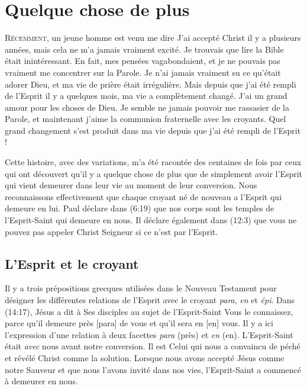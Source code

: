 \chapter{Quelque chose de plus}

\lettrine{R}{écemment}, un jeune homme est venu me dire\frcolon{}
 \Og J'ai accepté Christ il y a plusieurs années,
 mais cela ne m'a jamais vraiment excité.
 Je trouvais que lire la Bible était inintéressant.
 En fait, mes pensées vagabondaient, et je ne pouvais pas vraiment me concentrer
 sur la Parole. Je n'ai jamais vraiment su ce qu'était adorer Dieu,
 et ma vie de prière était irrégulière. Mais depuis que j'ai été rempli
 de l'Esprit il y a quelques mois, ma vie a complètement changé.
 J'ai un grand amour pour les choses de Dieu.
 Je semble ne jamais pouvoir me rassasier de la Parole, et maintenant j'aime
 la communion fraternelle avec les croyants.
 Quel grand changement s'est produit dans ma vie depuis que j'ai été rempli
 de l'Esprit ! \Fg{}

Cette histoire, avec des variations, m'a été racontée des centaines de fois
 par ceux qui ont découvert qu'il y a quelque chose de plus que de simplement
 avoir l'Esprit qui vient demeurer dans leur vie au moment de leur conversion.
 Nous reconnaissons effectivement que chaque croyant né de nouveau a l'Esprit
 qui demeure en lui. Paul déclare dans (6:19) que nos corps
 sont les temples de l'Esprit-Saint qui demeure en nous.
 Il déclare également dans (12:3) que vous ne pouvez pas
 appeler Christ Seigneur si ce n'est par l'Esprit.


\section{L'Esprit et le croyant}

Il y a trois prépositions grecques utilisées dans le Nouveau Testament
 pour désigner les différentes relations de l'Esprit avec le croyant\frcolon{}
 \emph{para}, \emph{en} et \emph{épi}.
 Dans (14:17), Jésus a dit à Ses disciples au sujet de
 l'Esprit-Saint\frcolon{} \Og Vous le connaissez, parce qu'il demeure près [para]
 de vous et qu'il sera en [en] vous. \Fg{}
 Il y a ici l'expression d'une relation à deux facettes\frcolon{}
 \emph{para} (près) et \emph{en} (en).
 L'Esprit-Saint était \emph{avec} nous avant notre conversion.
 Il est Celui qui nous a con\-vain\-cu de péché et révélé Christ
 comme la solution. Lorsque nous avons accepté Jésus comme notre Sauveur
 et que nous l'avons invité dans nos vies, l'Esprit-Saint
 a commencé à demeurer en nous.

